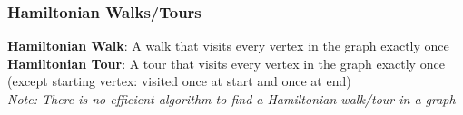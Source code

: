 \documentclass{beamer}
\begin{document}
\begin{frame}
    \frametitle{Hamiltonian Walks/Tours}
    {\bf Hamiltonian Walk}: A walk that visits every vertex in the graph exactly once\\
    {\bf Hamiltonian Tour}: A tour that visits every vertex in the graph exactly once (except starting vertex: visited once at start and once at end)\\
    {\it Note: There is no efficient algorithm to find a Hamiltonian walk/tour in a graph}
\end{frame}
\end{document}
